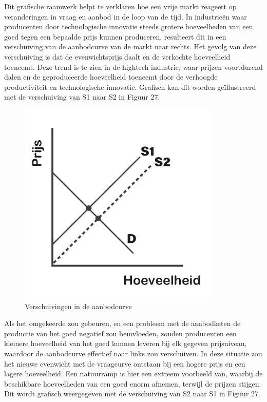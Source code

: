 Dit grafische raamwerk helpt te verklaren hoe een vrije markt reageert op veranderingen in vraag en aanbod in de loop van de tijd. In industrieën waar producenten door technologische innovatie steeds grotere hoeveelheden van een goed tegen een bepaalde prijs kunnen produceren, resulteert dit in een verschuiving van de aanbodcurve van de markt naar rechts. Het gevolg van deze verschuiving is dat de evenwichtsprijs daalt en de verkochte hoeveelheid toeneemt. Deze trend is te zien in de hightech industrie, waar prijzen voortdurend dalen en de geproduceerde hoeveelheid toeneemt door de verhoogde productiviteit en technologische innovatie. Grafisch kan dit worden geïllustreerd met de verschuiving van S1 naar S2 in Figuur 27.

\begin{figure}[h]
\centering
    \includegraphics[]{figures/fig27-1.png}
    \caption[Verschuivingen in de aanbodcurve]{Verschuivingen in de aanbodcurve}
    \label{fig27}
\end{figure}

Als het omgekeerde zou gebeuren, en een probleem met de aanbodketen de productie van het goed negatief zou beïnvloeden, zouden producenten een kleinere hoeveelheid van het goed kunnen leveren bij elk gegeven prijsniveau, waardoor de aanbodcurve effectief naar links zou verschuiven. In deze situatie zou het nieuwe evenwicht met de vraagcurve ontstaan bij een hogere prijs en een lagere hoeveelheid. Een natuurramp is hier een extreem voorbeeld van, waarbij de beschikbare hoeveelheden van een goed enorm afnemen, terwijl de prijzen stijgen. Dit wordt grafisch weergegeven met de verschuiving van S2 naar S1 in Figuur 27.

